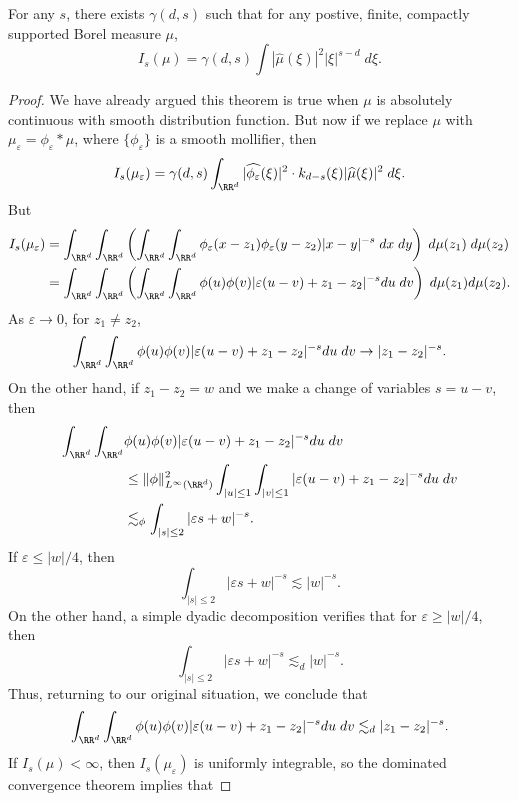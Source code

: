 \begin{theorem}	
	For any $s$, there exists $\gamma(d,s)$ such that for any postive, finite, compactly supported Borel measure $\mu$,
	\[ I_s(\mu) = \gamma(d,s) \int |\widehat{\mu}(\xi)|^2 |\xi|^{s-d}\; d\xi. \]
\end{theorem}
\begin{proof}
	We have already argued this theorem is true when $\mu$ is absolutely continuous with smooth distribution function. But now if we replace $\mu$ with $\mu_\varepsilon = \phi_\varepsilon * \mu$, where $\{ \phi_\varepsilon \}$ is a smooth mollifier, then
	\[ I_s(\mu_\varepsilon) = \gamma(d,s) \int_{\RR^d} |\widehat{\phi_\varepsilon}(\xi)|^2 \cdot k_{d-s}(\xi) |\widehat{\mu}(\xi)|^2\; d\xi. \]
	But
	\begin{align*}
	I_s(\mu_\varepsilon) &= \int_{\RR^d} \int_{\RR^d} \left( \int_{\RR^d} \int_{\RR^d} \phi_\varepsilon(x-z_1) \phi_\varepsilon(y - z_2) |x-y|^{-s} \;dx\; dy \right)\; d\mu(z_1)\; d\mu(z_2)\\
	&= \int_{\RR^d} \int_{\RR^d} \left( \int_{\RR^d} \int_{\RR^d} \phi(u) \phi(v) |\varepsilon(u - v) + z_1 - z_2|^{-s} du\; dv \right)\; d\mu(z_1) d\mu(z_2).
	\end{align*}
	As $\varepsilon \to 0$, for $z_1 \neq z_2$,
	\[ \int_{\RR^d} \int_{\RR^d} \phi(u) \phi(v) |\varepsilon(u - v) + z_1 - z_2|^{-s} du\; dv \to |z_1 - z_2|^{-s}. \]
	On the other hand, if $z_1 - z_2 = w$ and we make a change of variables $s = u - v$, then
	\begin{align*}
		\int_{\RR^d} \int_{\RR^d} & \phi(u) \phi(v) |\varepsilon(u - v) + z_1 - z_2|^{-s} du\; dv\\
		&\leq \| \phi \|_{L^\infty(\RR^d)}^2 \int_{|u| \leq 1} \int_{|v| \leq 1} |\varepsilon(u - v) + z_1 - z_2|^{-s} du\; dv\\
		&\lesssim_\phi \int_{|s| \leq 2} |\varepsilon s + w|^{-s}.
	\end{align*}
	If $\varepsilon \leq |w|/4$, then
	\[ \int_{|s| \leq 2} |\varepsilon s + w|^{-s} \lesssim |w|^{-s}. \]
	On the other hand, a simple dyadic decomposition verifies that for $\varepsilon \geq |w|/4$, then
	\[ \int_{|s| \leq 2} |\varepsilon s + w|^{-s} \lesssim_d |w|^{-s}. \]
	Thus, returning to our original situation, we conclude that
	\[ \int_{\RR^d} \int_{\RR^d} \phi(u) \phi(v) |\varepsilon(u - v) + z_1 - z_2|^{-s} du\; dv \lesssim_d |z_1 - z_2|^{-s}. \]
	If $I_s(\mu) < \infty$, then $I_s(\mu_\varepsilon)$ is uniformly integrable, so the dominated convergence theorem implies that

\end{proof}
